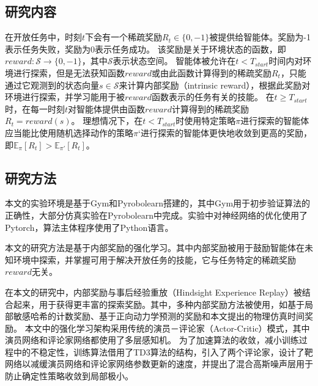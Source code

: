         \subsection{研究内容}
        在开放任务中，时刻$t$下会有一个稀疏奖励$R_t\in\{0,-1\}$被提供给智能体。奖励为-1表示任务失败，奖励为0表示任务成功。
        该奖励是关于环境状态的函数，即$reward:\mathcal S\to\{0,-1\}$，其中$\mathcal S$表示状态空间。
        智能体被允许在$t< T_{start}$时间内对环境进行探索，但是无法获知函数$reward$或由此函数计算得到的稀疏奖励$R_t$，只能通过它观测到的状态向量$s\in\mathcal S$来计算内部奖励（intrinsic reward），根据此奖励对环境进行探索，并学习能用于被$reward$函数表示的任务有关的技能。
        在$t\geq T_{start}$时，在每一时刻$t$对智能体提供由函数$reward$计算得到的稀疏奖励$R_t=reward(s)$。
        理想情况下，在$t<T_{start}$时使用特定策略$\pi$进行探索的智能体应当能比使用随机选择动作的策略$\pi‘$进行探索的智能体更快地收敛到更高的奖励，即$\mathbb E_\pi[R_t]>\mathbb E_{\pi'}[R_t]$。

        \subsection{研究方法}
        本文的实验环境是基于Gym\cite{brockman2016openai}和Pyrobolearn\cite{delhaisse2019pyrobolearn}搭建的，其中Gym用于初步验证算法的正确性，大部分仿真实验在Pyrobolearn中完成。实验中对神经网络的优化使用了Pytorch\cite{paszke2019pytorch}，算法主体程序使用了Python语言。

        本文的研究方法是基于内部奖励的强化学习。其中内部奖励被用于鼓励智能体在未知环境中探索，并掌握可用于解决开放任务的技能，它与任务特定的稀疏奖励$reward$无关。

        在本文的研究中，内部奖励与事后经验重放（Hindsight Experience Replay）被结合起来，用于获得更丰富的探索奖励。其中，多种内部奖励方法被使用，如基于局部敏感哈希的计数奖励、基于正向动力学预测的奖励和本文提出的物理仿真时间奖励。
        本文中的强化学习架构采用传统的演员－评论家（Actor-Critic）模式\cite{konda2002actor}，其中演员网络和评论家网络都使用了多层感知机。
        为了加速算法的收敛，减小训练过程中的不稳定性，训练算法借用了TD3算法\cite{DBLP:journals/corr/abs-1802-09477}的结构，引入了两个评论家，设计了靶网络以减缓演员网络和评论家网络参数更新的速度，并提出了混合高斯噪声层用于防止确定性策略收敛到局部极小。

